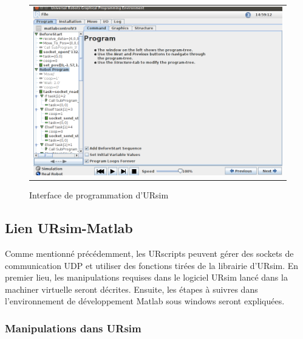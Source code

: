 \documentclass[root.tex]{subfiles}
\begin{document}
\begin{figure}
 \begin{center}
  \begin{tabular}{c}
    \includegraphics[trim=0cm 0cm 0cm 0cm, scale=0.45]{screenshots_tuto_ursim/interface_prog.png}
  \end{tabular}
 \end{center}
\caption{Interface de programmation d'URsim}
 \label{fig:ui_programmation}
\end{figure}



\subsection{Lien URsim-Matlab}
Comme mentionné précédemment, les URscripts peuvent gérer des sockets de communication UDP et utiliser des fonctions tirées de la librairie d'URsim. 
En premier lieu, les manipulations requises dans le logiciel URsim lancé dans la machiner virtuelle seront décrites.
Ensuite, les étapes à suivres dans l'environnement de développement Matlab sous windows seront expliquées.

\subsubsection{Manipulations dans URsim}
\end{document}
